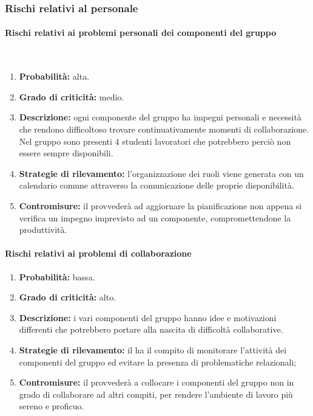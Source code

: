 \subsubsection{Rischi relativi al personale}
\paragraph{Rischi relativi ai problemi personali dei componenti del gruppo}\mbox{}\\
\begin{enumerate}
	\item \textbf{Probabilità:} alta.
	\item \textbf{Grado di criticità:} medio.
	\item \textbf{Descrizione:} ogni componente del gruppo ha impegni personali e necessità che rendono difficoltoso trovare continuativamente momenti di collaborazione. Nel gruppo sono presenti 4 studenti lavoratori che potrebbero perciò non essere sempre disponibili.
	\item \textbf{Strategie di rilevamento:} l’organizzazione dei ruoli viene generata con un calendario comune attraverso la comunicazione delle proprie disponibilità.
	\item \textbf{Contromisure:} il \Responsabile{} provvederà ad aggiornare la pianificazione non appena si verifica un impegno imprevisto ad un componente, compromettendone la produttività.
\end{enumerate}

\paragraph{Rischi relativi ai problemi di collaborazione}\mbox{}
\begin{enumerate}
	\item \textbf{Probabilità:} bassa.
	\item \textbf{Grado di criticità:} alto.
	\item \textbf{Descrizione:} i vari componenti del gruppo hanno idee e motivazioni differenti che potrebbero portare alla nascita di difficoltà collaborative.
	\item \textbf{Strategie di rilevamento:} il \Responsabile{} ha il compito di monitorare l’attività dei componenti del gruppo ed evitare la presenza di problematiche relazionali;
	\item \textbf{Contromisure:} il \Responsabile{} provvederà a collocare i componenti del gruppo non in grado di collaborare ad altri compiti, per rendere l’ambiente di lavoro più sereno e proficuo.
\end{enumerate}

